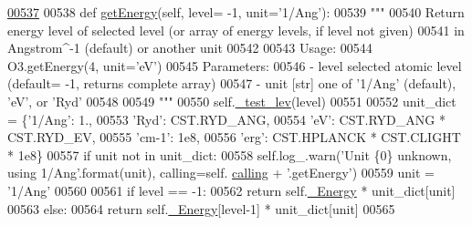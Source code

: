 \begin{DoxyCode}
\hypertarget{classpyneb_1_1core_1_1pynebcore_1_1___atom_data_ascii_l00537}{}\hyperlink{classpyneb_1_1core_1_1pynebcore_1_1___atom_data_ascii_af747dc13a858a4eacc6107aedad89bd0}{00537} 
00538     \textcolor{keyword}{def }\hyperlink{classpyneb_1_1core_1_1pynebcore_1_1___atom_data_ascii_af747dc13a858a4eacc6107aedad89bd0}{getEnergy}(self, level= -1, unit='1/Ang'):
00539         \textcolor{stringliteral}{"""}
00540 \textcolor{stringliteral}{        Return energy level of selected level (or array of energy levels, if level not given) }
00541 \textcolor{stringliteral}{            in Angstrom^-1 (default) or another unit}
00542 \textcolor{stringliteral}{        }
00543 \textcolor{stringliteral}{        Usage:}
00544 \textcolor{stringliteral}{            O3.getEnergy(4, unit='eV')}
00545 \textcolor{stringliteral}{        Parameters:}
00546 \textcolor{stringliteral}{            - level  selected atomic level (default= -1, returns complete array)}
00547 \textcolor{stringliteral}{            - unit   [str] one of '1/Ang' (default), 'eV', or 'Ryd'    }
00548 \textcolor{stringliteral}{            }
00549 \textcolor{stringliteral}{        """}
00550         self.\hyperlink{classpyneb_1_1core_1_1pynebcore_1_1___atom_data_ascii_ad2a85bdc0d1803e4b5fe7b77aecc0ff9}{\_test\_lev}(level)
00551 
00552         unit\_dict = \{\textcolor{stringliteral}{'1/Ang'}: 1.,
00553                      \textcolor{stringliteral}{'Ryd'}: CST.RYD\_ANG,
00554                      \textcolor{stringliteral}{'eV'}: CST.RYD\_ANG * CST.RYD\_EV,
00555                      \textcolor{stringliteral}{'cm-1'}: 1e8,
00556                      \textcolor{stringliteral}{'erg'}: CST.HPLANCK * CST.CLIGHT * 1e8\}
00557         \textcolor{keywordflow}{if} unit \textcolor{keywordflow}{not} \textcolor{keywordflow}{in} unit\_dict:
00558             self.log\_.warn(\textcolor{stringliteral}{'Unit \{0\} unknown, using 1/Ang'}.format(unit), calling=self.
      \hyperlink{classpyneb_1_1core_1_1pynebcore_1_1___atom_data_ascii_af5c364ae799620ff1af6870cf78ae19b}{calling} + \textcolor{stringliteral}{'.getEnergy'})
00559             unit = \textcolor{stringliteral}{'1/Ang'}        
00560         
00561         \textcolor{keywordflow}{if} level == -1:
00562             \textcolor{keywordflow}{return} self.\hyperlink{classpyneb_1_1core_1_1pynebcore_1_1___atom_data_ascii_af9153c0218e68a785d82510cb2ee6248}{\_Energy} * unit\_dict[unit]
00563         \textcolor{keywordflow}{else}:
00564             \textcolor{keywordflow}{return} self.\hyperlink{classpyneb_1_1core_1_1pynebcore_1_1___atom_data_ascii_af9153c0218e68a785d82510cb2ee6248}{\_Energy}[level-1] * unit\_dict[unit]
00565         

\end{DoxyCode}
